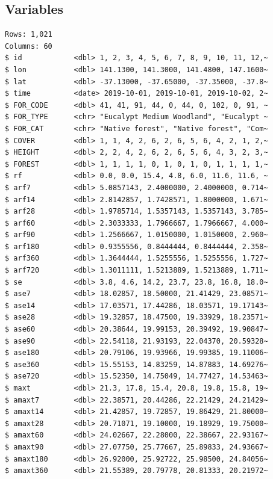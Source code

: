 \documentclass[
  letterpaper,
]{krantz}
\begin{document}
\subsection*{Variables}\label{variables-1}

\begin{verbatim}
Rows: 1,021
Columns: 60
$ id            <dbl> 1, 2, 3, 4, 5, 6, 7, 8, 9, 10, 11, 12,~
$ lon           <dbl> 141.1300, 141.3000, 141.4800, 147.1600~
$ lat           <dbl> -37.13000, -37.65000, -37.35000, -37.8~
$ time          <date> 2019-10-01, 2019-10-01, 2019-10-02, 2~
$ FOR_CODE      <dbl> 41, 41, 91, 44, 0, 44, 0, 102, 0, 91, ~
$ FOR_TYPE      <chr> "Eucalypt Medium Woodland", "Eucalypt ~
$ FOR_CAT       <chr> "Native forest", "Native forest", "Com~
$ COVER         <dbl> 1, 1, 4, 2, 6, 2, 6, 5, 6, 4, 2, 1, 2,~
$ HEIGHT        <dbl> 2, 2, 4, 2, 6, 2, 6, 5, 6, 4, 3, 2, 3,~
$ FOREST        <dbl> 1, 1, 1, 1, 0, 1, 0, 1, 0, 1, 1, 1, 1,~
$ rf            <dbl> 0.0, 0.0, 15.4, 4.8, 6.0, 11.6, 11.6, ~
$ arf7          <dbl> 5.0857143, 2.4000000, 2.4000000, 0.714~
$ arf14         <dbl> 2.8142857, 1.7428571, 1.8000000, 1.671~
$ arf28         <dbl> 1.9785714, 1.5357143, 1.5357143, 3.785~
$ arf60         <dbl> 2.3033333, 1.7966667, 1.7966667, 4.000~
$ arf90         <dbl> 1.2566667, 1.0150000, 1.0150000, 2.960~
$ arf180        <dbl> 0.9355556, 0.8444444, 0.8444444, 2.358~
$ arf360        <dbl> 1.3644444, 1.5255556, 1.5255556, 1.727~
$ arf720        <dbl> 1.3011111, 1.5213889, 1.5213889, 1.711~
$ se            <dbl> 3.8, 4.6, 14.2, 23.7, 23.8, 16.8, 18.0~
$ ase7          <dbl> 18.02857, 18.50000, 21.41429, 23.08571~
$ ase14         <dbl> 17.03571, 17.44286, 18.03571, 19.17143~
$ ase28         <dbl> 19.32857, 18.47500, 19.33929, 18.23571~
$ ase60         <dbl> 20.38644, 19.99153, 20.39492, 19.90847~
$ ase90         <dbl> 22.54118, 21.93193, 22.04370, 20.59328~
$ ase180        <dbl> 20.79106, 19.93966, 19.99385, 19.11006~
$ ase360        <dbl> 15.55153, 14.83259, 14.87883, 14.69276~
$ ase720        <dbl> 15.52350, 14.75049, 14.77427, 14.53463~
$ maxt          <dbl> 21.3, 17.8, 15.4, 20.8, 19.8, 15.8, 19~
$ amaxt7        <dbl> 22.38571, 20.44286, 22.21429, 24.21429~
$ amaxt14       <dbl> 21.42857, 19.72857, 19.86429, 21.80000~
$ amaxt28       <dbl> 20.71071, 19.10000, 19.18929, 19.75000~
$ amaxt60       <dbl> 24.02667, 22.28000, 22.38667, 22.93167~
$ amaxt90       <dbl> 27.07750, 25.77667, 25.89833, 24.93667~
$ amaxt180      <dbl> 26.92000, 25.92722, 25.98500, 24.84056~
$ amaxt360      <dbl> 21.55389, 20.79778, 20.81333, 20.21972~

\end{verbatim}
\end{document}

